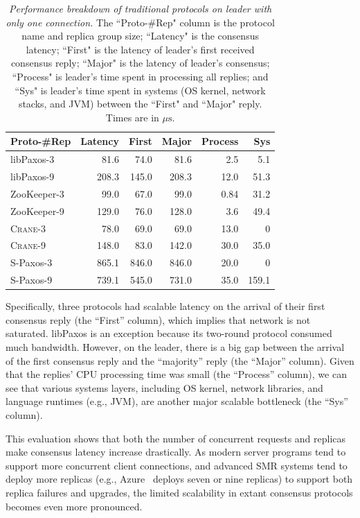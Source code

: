 \documentclass[10pt,onecolumn,letterpaper]{article}
\newcommand{\zookeeper}{ZooKeeper\xspace}
\newcommand{\libpaxos}{libPaxos\xspace}
\newcommand{\spaxos}{S-Paxos\xspace}
\newcommand{\crane}{\textsc{Crane}\xspace}
\newcommand{\eg}{{e.g.}}
\newcommand{\us}[0]{\(\mu\text{s}\)\xspace}
\begin{document}
\begin{sloppypar}
\begin{table}[h]
\caption{{\em Performance breakdown of traditional protocols on leader
with only one connection.} The ``Proto-\#Rep" column is the protocol name 
and replica group size; ``Latency" is the consensus latency; ``First" 
is the latency of leader's first received consensus reply; ``Major" is the
latency of leader's consensus; ``Process" is leader's time spent in
processing all replies; and ``Sys" is leader's time spent in systems (OS
kernel, network stacks, and JVM) between the ``First" and ``Major" 
reply. Times are in \us.}
\label{tab:traditional-latency}
\centering
\begin{tabular}{lrrrrr}
\toprule
{\bf Proto-\#Rep} & {\bf Latency} & {\bf First} & {\bf Major} & {\bf
Process}
& {\bf Sys}\\
\midrule
\libpaxos-3 & 81.6 & 74.0  & 81.6 & 2.5 & 5.1\\
\libpaxos-9 & 208.3 & 145.0  & 208.3 & 12.0 & 51.3\\

\zookeeper-3 & 99.0 & 67.0  & 99.0 & 0.84 & 31.2\\
\zookeeper-9 & 129.0 & 76.0  & 128.0 & 3.6 & 49.4\\

\crane-3 & 78.0 & 69.0  & 69.0 & 13.0 & 0\\
\crane-9 & 148.0 & 83.0  & 142.0 & 30.0 & 35.0\\

\spaxos-3 & 865.1 & 846.0  & 846.0 & 20.0 & 0\\
\spaxos-9 & 739.1 & 545.0  & 731.0 & 35.0 & 159.1\\
\bottomrule
\end{tabular}
\end{table}

Specifically, three protocols had scalable latency on the arrival of their 
first consensus reply (the ``First'' column), which implies that network is not 
saturated. \libpaxos is an exception because its two-round protocol consumed 
much bandwidth. However, on the leader, there is a big gap between the arrival 
of the first consensus reply and the ``majority'' reply (the ``Major'' column). 
Given that the replies' CPU processing time was small (the ``Process'' column), 
we can see that various systems layers, including OS kernel, network 
libraries, and language runtimes (e.g., JVM), are another major scalable 
bottleneck (the ``Sys'' column).
 
This evaluation shows that both the number of concurrent requests and 
replicas make consensus latency increase drastically. As modern server programs 
tend to support more concurrent client connections, and advanced SMR systems 
tend to deploy more replicas (\eg, Azure~\cite{azure:book} deploys seven or 
nine replicas) to support both replica failures and upgrades, the limited 
scalability in extant consensus protocols becomes even more pronounced.


\end{sloppypar}
\end{document}
